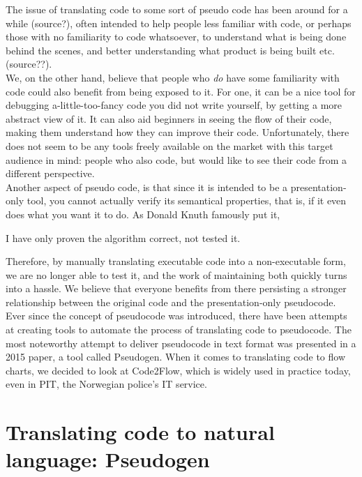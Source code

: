 The issue of translating code to some sort of pseudo code has been around for a while (source?), often intended to help people less familiar with code, or perhaps those with no familiarity to code whatsoever, to understand what is being done behind the scenes, and better understanding what product is being built etc. (source??). \hfill \\

We, on the other hand, believe that people who \textit{do} have some familiarity with code could also benefit from being exposed to it. For one, it can be a nice tool for debugging a-little-too-fancy code you did not write yourself, by getting a more abstract view of it. It can also aid beginners in seeing the flow of their code, making them understand how they can improve their code. Unfortunately, there does not seem to be any tools freely available on the market with this target audience in mind: people who also code, but would like to see their code from a different perspective. \hfill \\

Another aspect of pseudo code, is that since it is intended to be a presentation-only tool, you cannot actually verify its semantical properties, that is, if it even does what you want it to do. As Donald Knuth famously put it,

\begin{displayquote}
    I have only proven the algorithm correct, not tested it.\cite{DBLP:books/aw/Knuth68}
\end{displayquote}

Therefore, by manually translating executable code into a non-executable form, we are no longer able to test it, and the work of maintaining both quickly turns into a hassle. We believe that everyone benefits from there persisting a stronger relationship between the original code and the presentation-only pseudocode. \hfill \\

Ever since the concept of pseudocode was introduced, there have been attempts at creating tools to automate the process of translating code to pseudocode. The most noteworthy attempt to deliver pseudocode in text format was presented in a 2015 paper, a tool called Pseudogen. When it comes to translating code to flow charts, we decided to look at Code2Flow, which is widely used in practice today, even in PIT, the Norwegian police's IT service. \hfill \\

\section{Translating code to natural language: Pseudogen}

